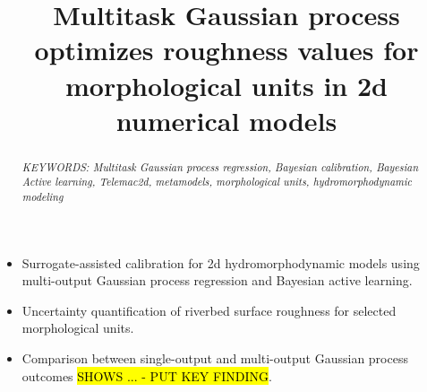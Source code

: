 \documentclass[draft,linenumbers,onecolumn]{agujournal2019} %
\begin{document}
\title{Multitask Gaussian process optimizes roughness values for morphological units in 2d numerical models}

\graphicspath{ {./images/} }

%
%






\begin{itemize}
	\item Surrogate-assisted calibration for 2d hydromorphodynamic models using multi-output Gaussian process regression and Bayesian active learning.
	\item Uncertainty quantification of riverbed surface roughness for selected morphological units.
	\item Comparison between single-output and multi-output Gaussian process outcomes  \hl{SHOWS ... - PUT KEY FINDING}.
\end{itemize}

%
%



\begin{abstract}
	
	
\textit{KEYWORDS: Multitask Gaussian process regression, Bayesian calibration, Bayesian Active learning, Telemac2d, metamodels, morphological units, hydromorphodynamic modeling}
\end{abstract}
\end{document}
